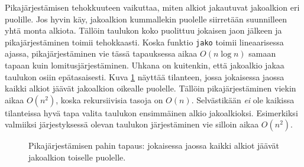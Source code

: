 Pikajärjestämisen tehokkuuteen vaikuttaa, miten alkiot jakautuvat
jakoalkion eri puolille.
Jos hyvin käy, jakoalkion kummallekin puolelle
siirretään suunnilleen yhtä monta alkiota.
Tällöin taulukon koko puolittuu jokaisen jaon jälkeen
ja pikajärjestäminen toimii tehokkaasti.
Koska funktio \texttt{jako} toimii lineaarisessa ajassa,
pikajärjestäminen vie tässä tapauksessa aikaa
$O(n \log n)$ samaan tapaan kuin lomitusjärjestäminen.
Uhkana on kuitenkin, että jakoalkio jakaa taulukon osiin epätasaisesti.
Kuva \ref{fig:pikpah} näyttää tilanteen, jossa jokaisessa jaossa
kaikki alkiot jäävät jakoalkion oikealle puolelle.
Tällöin pikajärjestäminen viekin aikaa $O(n^2)$, koska rekursiivisia
tasoja on $O(n)$.
Selvästikään \emph{ei} ole kaikissa tilanteissa hyvä tapa
valita taulukon ensimmäinen alkio jakoalkioksi.
Esimerkiksi valmiiksi järjestyksessä olevan
taulukon järjestäminen vie silloin aikaa $O(n^2)$.

\begin{figure}
\center
{}
\caption{Pikajärjestämisen pahin tapaus: jokaisessa jaossa kaikki
alkiot jäävät jakoalkion toiselle puolelle.}
\label{fig:pikpah}
\end{figure}

